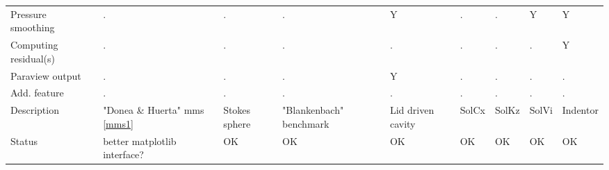 \begin{landscape}
{\begin{tabular}{|l|p{2cm}|p{2cm}|p{2cm}|p{2cm}|p{2cm}|p{2cm}|p{2cm}|p{2cm}|}
Pressure smoothing & .& .& .& Y&.&.&Y&Y \\
Computing residual(s) &.&.&.&.&.&.&.&Y \\ 
Paraview output &.&.&.&Y&.&.&.&. \\ 
\hline
Add. feature &.&.&.&.&.&.&.&. \\
\hline
Description &
"Donea \& Huerta" mms \ref{mms1} &
Stokes sphere&
"Blankenbach" benchmark&
Lid driven cavity&
SolCx &
SolKz & 
SolVi & 
Indentor \\
\hline
Status & better matplotlib interface? & OK & OK & OK & OK & OK & OK & OK \\
\hline
\end{tabular}
}





\vspace{.5cm}


\end{landscape}
